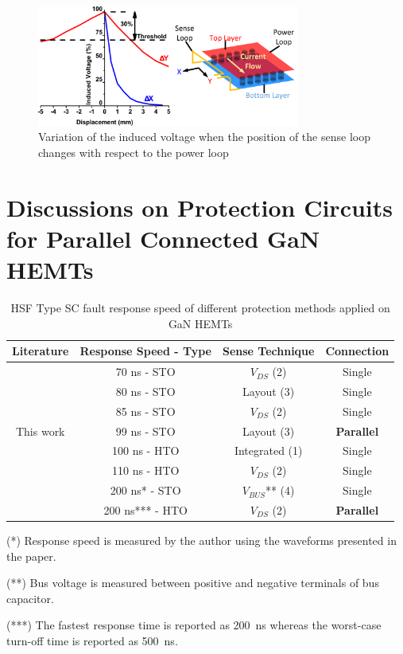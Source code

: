 \documentclass[journal]{IEEEtran}
\begin{document}
\begin{figure}[]
\centering
\includegraphics[width=3.4in]{Figures/Fig17-Symbolic Layout-v2.pdf}
\caption{Variation of the induced voltage when the position of the sense loop changes with respect to the power loop}
\label{fig_displacement}
\end{figure}

\section{Discussions on Protection Circuits for Parallel Connected GaN HEMTs}

\begin{table}[t]
\renewcommand{\arraystretch}{1.3}
\caption{HSF Type SC fault response speed of different protection methods applied on GaN HEMTs}
\label{table_comparison}
\centering
\begin{tabular}{|c|c|c|c|}
\hline
Literature & Response Speed - Type & Sense Technique & Connection\\
\hline
\cite{Hou2019} & 70 ns - STO & $V_{DS}$ (2) & Single\\
\hline
\cite{Alemdar2019} & 80 ns - STO & Layout (3) & Single\\
\hline
\cite{Hou2018a}& 85 ns - STO & $V_{DS}$ (2) & Single\\
\hline
\rowcolor{Gray}
This work & 99 ns - STO& Layout (3) & \textbf{Parallel}\\
\hline
\cite{Dusmez2018} & 100 ns - HTO & Integrated (1) & Single\\
\hline
\cite{Wu2020} & 110 ns - HTO& $V_{DS}$ (2) & Single\\
\hline
\cite{Lyu2020} & 200 ns* - STO& $V_{BUS}$** (4) & Single\\
\hline
\cite{Gui2018} & 200 ns*** - HTO& $V_{DS}$ (2) & \textbf{Parallel}\\
\hline
\end{tabular}
\begin{flushleft}
(*) Response speed is measured by the author using the waveforms presented in the paper.

(**) Bus voltage is measured between positive and negative terminals of bus capacitor.

(***) The fastest response time is reported as 200~ns whereas the worst-case turn-off time is reported as 500~ns.
\end{flushleft}
\end{table}
\end{document}
